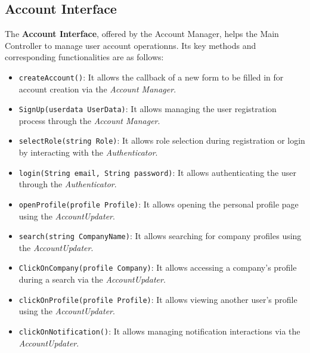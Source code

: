 \subsection{Account Interface}
The \textbf{Account Interface}, offered by the Account Manager, helps the Main Controller to manage user account operationns. Its key methods and corresponding functionalities are as follows:
\begin{itemize}
    \item \texttt{createAccount()}: It allows the callback of a new form to be filled in for account creation via the \textit{Account Manager}.
    \item \texttt{SignUp(userdata UserData)}: It allows managing the user registration process through the \textit{Account Manager}.
    \item \texttt{selectRole(string Role)}: It allows role selection during registration or login by interacting with the \textit{Authenticator}.
    \item \texttt{login(String email, String password)}: It allows authenticating the user through the \textit{Authenticator}.
    \item \texttt{openProfile(profile Profile)}: It allows opening the personal profile page using the \textit{AccountUpdater}.
    \item \texttt{search(string CompanyName)}: It allows searching for company profiles using the \textit{AccountUpdater}.
    \item \texttt{ClickOnCompany(profile Company)}: It allows accessing a company’s profile during a search via the \textit{AccountUpdater}.
    \item \texttt{clickOnProfile(profile Profile)}: It allows viewing another user’s profile using the \textit{AccountUpdater}.
    \item \texttt{clickOnNotification()}: It allows managing notification interactions via the \textit{AccountUpdater}.
\end{itemize}

